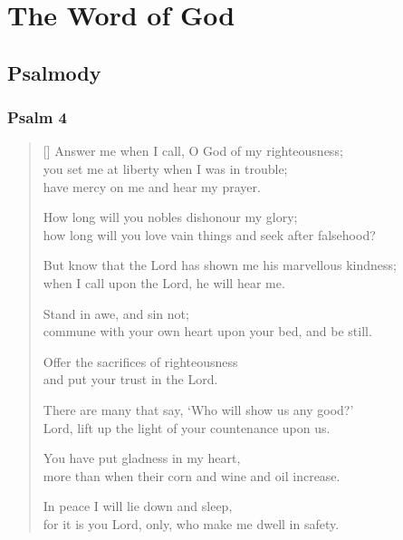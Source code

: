 \documentclass[12pt]{extreport}
\begin{document}
	\newpage

	\section*{The Word of God}

	\subsection*{Psalmody}


	\subsubsection*{Psalm 4}

	\begin{verse}[\versewidth]
		Answer me when I call, O God of my righteousness; \Pause\\
		you set me at liberty when I was in trouble;\\
		\vin have mercy on me and hear my prayer.

		How long will you nobles dishonour my glory; \Pause\\
		how long will you love vain things and seek after falsehood?

		But know that the Lord has shown me his marvellous kindness; \Pause\\
		when I call upon the Lord, he will hear me.

		Stand in awe, and sin not; \Pause\\
		commune with your own heart upon your bed, and be still.

		Offer the sacrifices of righteousness \Pause\\
		and put your trust in the Lord.

		There are many that say, `Who will show us any good?' \Pause\\
		Lord, lift up the light of your countenance upon us.

		You have put gladness in my heart, \Pause\\
		more than when their corn and wine and oil increase.

		In peace I will lie down and sleep, \Pause\\
		for it is you Lord, only, who make me dwell in safety.
	\end{verse}
\end{document}
